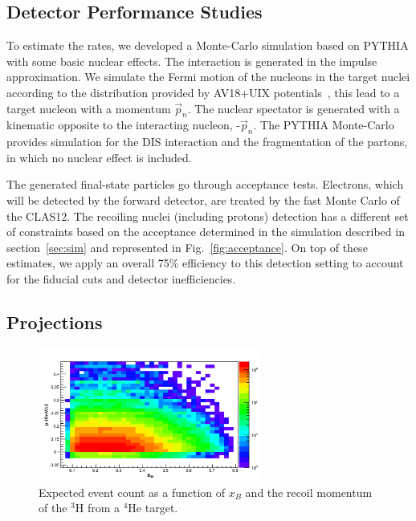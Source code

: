 \subsection{Detector Performance Studies}

To estimate the rates, we developed a Monte-Carlo simulation based on PYTHIA with some basic nuclear effects. The interaction is generated in the impulse approximation. We simulate the Fermi motion of the nucleons in the target nuclei according to the distribution provided by AV18+UIX potentials~\cite{Wiringa1995,Pudliner1997,Wiringa}, this lead to a target nucleon with a momentum $\vec p_n$. The nuclear spectator is generated with a kinematic opposite to the interacting nucleon, -$\vec p_n$. The PYTHIA Monte-Carlo provides simulation for the DIS interaction and the fragmentation of the partons, in which no nuclear effect is included.

The generated final-state particles go through acceptance tests. Electrons, which will be detected by the forward detector, are treated by the fast Monte Carlo of the CLAS12. The recoiling nuclei (including protons) detection has a different set of constraints based on the acceptance determined in the simulation described in section~\ref{sec:sim} and represented in Fig.~\ref{fig:acceptance}. On top of these estimates, we apply an overall 75\% efficiency to this detection setting to account for the fiducial cuts and detector inefficiencies.

\subsection{Projections}

\begin{figure}[tbp]
  \begin{center}
    \includegraphics[angle=0, width=0.65\textwidth]{./fig-chap3/MomVsX-H3}
    \caption{Expected event count as a function of $x_B$ and the recoil momentum of the $^3$H from a $^4$He target.}
    \label{fig:xb_vs_p}
  \end{center}
\end{figure}

